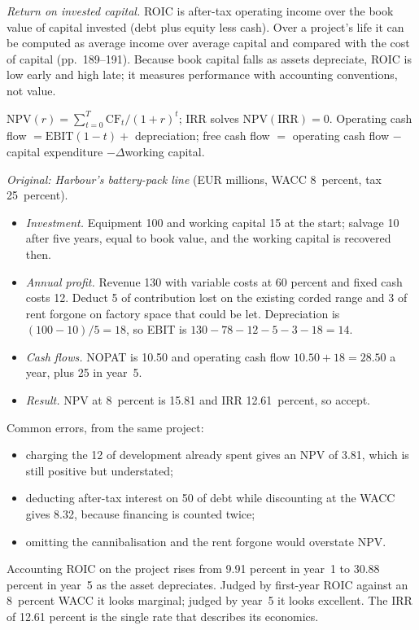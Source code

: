 \begin{qfmethod}
\emph{Return on invested capital.} ROIC is after-tax operating income over the book value of capital invested (debt plus equity less cash). Over a project's life it can be computed as average income over average capital and compared with the cost of capital (pp.~189--191). Because book capital falls as assets depreciate, ROIC is low early and high late; it measures performance with accounting conventions, not value.

 $\mathrm{NPV}(r)=\sum_{t=0}^{T}\mathrm{CF}_t/(1+r)^t$; IRR solves $\mathrm{NPV}(\mathrm{IRR})=0$. Operating cash flow $=\mathrm{EBIT}(1-t)+$ depreciation; free cash flow $=$ operating cash flow $-$ capital expenditure $-\Delta$working capital.

 \emph{Original: Harbour's battery-pack line} (EUR millions, WACC 8~percent, tax 25~percent).
\begin{itemize}
\item \emph{Investment.} Equipment 100 and working capital 15 at the start; salvage 10 after five years, equal to book value, and the working capital is recovered then.
\item \emph{Annual profit.} Revenue 130 with variable costs at 60 percent and fixed cash costs 12. Deduct 5 of contribution lost on the existing corded range and 3 of rent forgone on factory space that could be let. Depreciation is $(100-10)/5=18$, so EBIT is $130-78-12-5-3-18=14$.
\item \emph{Cash flows.} NOPAT is 10.50 and operating cash flow $10.50+18=28.50$ a year, plus 25 in year~5.
\item \emph{Result.} NPV at 8~percent is 15.81 and IRR 12.61~percent, so accept.
\end{itemize}

Common errors, from the same project:
\begin{itemize}
\item charging the 12 of development already spent gives an NPV of 3.81, which is still positive but understated;
\item deducting after-tax interest on 50 of debt while discounting at the WACC gives 8.32, because financing is counted twice;
\item omitting the cannibalisation and the rent forgone would overstate NPV.
\end{itemize}
Accounting ROIC on the project rises from 9.91 percent in year~1 to 30.88 percent in year~5 as the asset depreciates. Judged by first-year ROIC against an 8~percent WACC it looks marginal; judged by year~5 it looks excellent. The IRR of 12.61 percent is the single rate that describes its economics.


\end{qfmethod}
